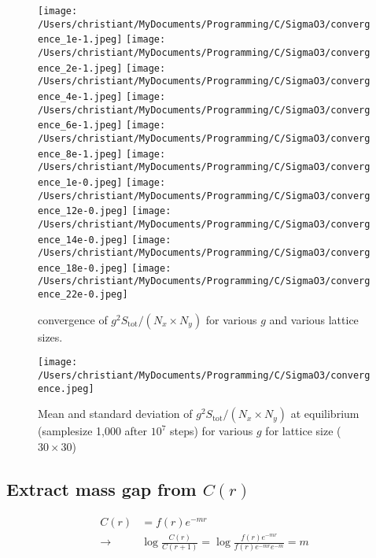 \documentclass[10pt,a4paper]{article}
\theoremstyle{definition}
\begin{document}
\begin{figure}[!h]
\centering
\texttt{[image: /Users/christiant/MyDocuments/Programming/C/SigmaO3/convergence\_1e-1.jpeg]}
\texttt{[image: /Users/christiant/MyDocuments/Programming/C/SigmaO3/convergence\_2e-1.jpeg]}
\texttt{[image: /Users/christiant/MyDocuments/Programming/C/SigmaO3/convergence\_4e-1.jpeg]}
\texttt{[image: /Users/christiant/MyDocuments/Programming/C/SigmaO3/convergence\_6e-1.jpeg]}
\texttt{[image: /Users/christiant/MyDocuments/Programming/C/SigmaO3/convergence\_8e-1.jpeg]}
\texttt{[image: /Users/christiant/MyDocuments/Programming/C/SigmaO3/convergence\_1e-0.jpeg]}
\texttt{[image: /Users/christiant/MyDocuments/Programming/C/SigmaO3/convergence\_12e-0.jpeg]}
\texttt{[image: /Users/christiant/MyDocuments/Programming/C/SigmaO3/convergence\_14e-0.jpeg]}
\texttt{[image: /Users/christiant/MyDocuments/Programming/C/SigmaO3/convergence\_18e-0.jpeg]}
\texttt{[image: /Users/christiant/MyDocuments/Programming/C/SigmaO3/convergence\_22e-0.jpeg]}
\caption{convergence of $g^2S_\text{tot}/(N_x\times N_y)$ for various $g$ and various lattice sizes.}
\label{fig:example}
\end{figure}

\begin{figure}[!h]
\centering
\texttt{[image: /Users/christiant/MyDocuments/Programming/C/SigmaO3/convergence.jpeg]}

\caption{Mean and standard deviation of $g^2S_\text{tot}/(N_x\times N_y)$ at equilibrium (samplesize 1,000 after $10^7$ steps) for various $g$ for lattice size ($30\times30$)}
\label{fig:example1}
\end{figure}


\subsection{Extract mass gap from  $C(r)$}

\begin{align}
C(r)&=f(r)e^{-mr}\\
\rightarrow&\log\frac{C(r)}{C(r+1)}=\log\frac{f(r)e^{-mr}}{f(r)e^{-mr}e^{-m}}=m
\end{align}
\end{document}

